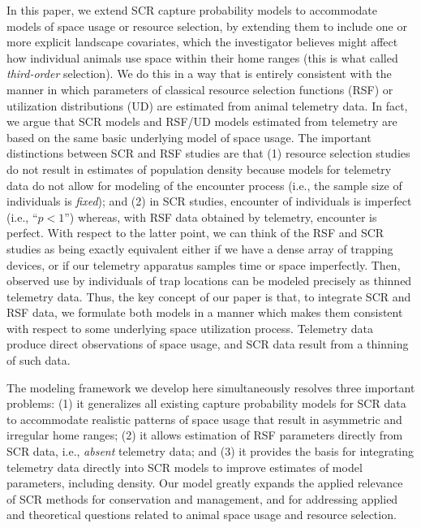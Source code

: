 \documentclass[12pt]{article}
\begin{document}
In this paper, we extend SCR capture probability models to accommodate
models of space usage or resource selection, by extending them to
include one or more explicit landscape covariates, which the
investigator believes might affect how individual animals use space
within their home ranges (this is what \citet{johnson:1980} called {\it
  third-order} selection). We do this in a way that is entirely
consistent with the manner in which parameters of classical resource
selection functions (RSF) \citep{manly_etal:2002} or utilization
distributions (UD) \citep{worton:1989, fieberg:2005, fieberg:2007} are
estimated from animal telemetry data.  In fact, we argue that SCR
models and RSF/UD models estimated from telemetry are based on the
same basic underlying model of space usage. The important distinctions
between SCR and RSF studies are that (1) resource selection studies do
not result in estimates of population density because models for
telemetry data do not allow for modeling of the encounter process
(i.e., the sample size of individuals is {\it fixed}); and (2) in SCR
studies, encounter of individuals is imperfect (i.e., ``$p<1$'')
whereas, with RSF data obtained by telemetry, encounter is perfect.
With respect to the latter point, we can think of the RSF and SCR
studies as being exactly equivalent either if we have a dense array of
trapping devices, or if our telemetry apparatus samples time or space
imperfectly.  Then, observed use by individuals of trap locations can
be modeled precisely as thinned telemetry data.  Thus, the key
concept of our paper is that, to
 integrate SCR and RSF data, we
formulate both models in a manner which makes them
consistent with respect to some underlying space utilization
process. Telemetry data produce direct observations of space usage,
and SCR data result from a thinning of such data.

The modeling framework we develop here simultaneously resolves three
important
problems: (1) it generalizes all existing capture probability models
for SCR data to accommodate realistic patterns of space usage that
result in asymmetric and irregular home
ranges;
(2) it allows estimation of RSF parameters directly from SCR data,
i.e., {\it absent} telemetry data; and (3) it provides the basis for
integrating telemetry data directly into SCR models to improve
estimates of model parameters, including density.  Our model greatly
expands the applied relevance of SCR methods for conservation and
management, and for addressing applied and theoretical questions
related to animal space usage and resource selection.
\end{document}
